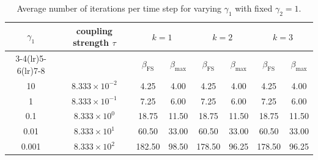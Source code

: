 \begin{table}[ht!]
\centering
\renewcommand{\arraystretch}{1.15}
\begin{tabular}{cccccccc}
\toprule
$\gamma_1$ & coupling strength $\tau$ & \multicolumn{2}{c}{$k=1$} & \multicolumn{2}{c}{$k=2$} & \multicolumn{2}{c}{$k=3$} \\
\cmidrule(lr){3-4}\cmidrule(lr){5-6}\cmidrule(lr){7-8}
& & $\beta_{\mathrm{FS}}$ & $\beta_{\max}$ & $\beta_{\mathrm{FS}}$ & $\beta_{\max}$ & $\beta_{\mathrm{FS}}$ & $\beta_{\max}$ \\
\midrule
10 & $8.333 \times 10^{-2}$ & 4.25 & 4.00 & 4.25 & 4.00 & 4.25 & 4.00 \\
1 & $8.333 \times 10^{-1}$ & 7.25 & 6.00 & 7.25 & 6.00 & 7.25 & 6.00 \\
0.1 & $8.333 \times 10^{0}$ & 18.75 & 11.50 & 18.75 & 11.50 & 18.75 & 11.50 \\
0.01 & $8.333 \times 10^{1}$ & 60.50 & 33.00 & 60.50 & 33.00 & 60.50 & 33.00 \\
0.001 & $8.333 \times 10^{2}$ & 182.50 & 98.50 & 178.50 & 96.25 & 178.50 & 96.25 \\
\bottomrule
\end{tabular}
\caption{Average number of iterations per time step for varying $\gamma_1$ with fixed $\gamma_2 = 1$.}
\label{tab:manufactured_gamma_scan}
\end{table}